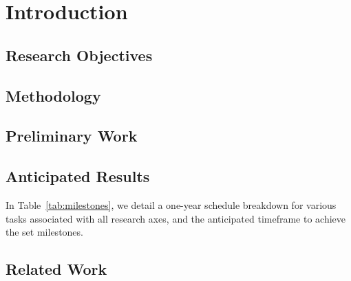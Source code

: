 \section{Introduction}


\subsection{Research Objectives}


\subsection{Methodology}


\subsection{Preliminary Work}


\subsection{Anticipated Results}
In Table~\ref{tab:milestones}, we detail a one-year schedule breakdown for various tasks associated with all research axes, and the anticipated timeframe to achieve the set milestones.


\subsection{Related Work}





